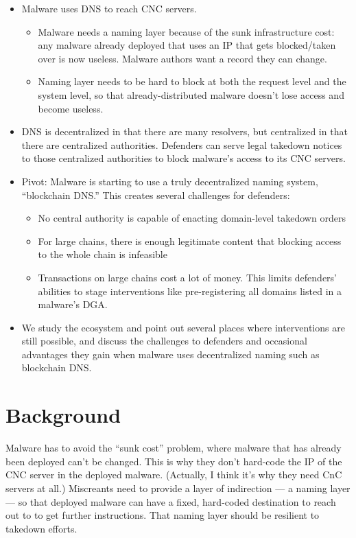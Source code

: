 \documentclass[10pt,sigconf,letterpaper]{acmart}
\begin{document}
\begin{itemize}
	\item Malware uses DNS to reach CNC servers. 
	\begin{itemize}
		\item Malware needs a naming layer because of the 
		sunk infrastructure cost: 
		any malware already deployed that uses an IP that gets blocked/taken 
		over is now useless. Malware authors want a record they can change.
		\item Naming layer needs to be hard to block at both 
		the request level and the system level, so that 
		already-distributed malware doesn't lose access and 
		become useless. 
	\end{itemize}
	\item DNS is decentralized in that there are many resolvers, but 
	centralized in that there are centralized authorities. Defenders can serve 
	legal takedown notices to those centralized authorities to block malware's 
	access to its CNC servers.
	\item Pivot: Malware is starting to use a truly decentralized naming 
	system, ``blockchain DNS.'' This creates several challenges for defenders:
	\begin{itemize}
		\item No central authority is capable of enacting domain-level takedown 
		orders
		\item For large chains, there is enough legitimate content that 
		blocking access to the whole chain is infeasible
		\item Transactions on large chains cost a lot of money. This limits 
		defenders' abilities to stage interventions like pre-registering all 
		domains listed in a malware's DGA.
	\end{itemize}
	\item We study the ecosystem and point out several places where 
	interventions are still possible, and discuss the challenges to defenders 
	and occasional advantages they gain when malware uses decentralized naming 
	such as blockchain DNS.
\end{itemize}

\section{Background}


Malware has to avoid the “sunk cost” problem, where malware that has 
already been deployed can’t be changed. This is why they don’t hard-code 
the IP of the CNC server in the deployed malware. (Actually, I think it’s 
why they need CnC servers at all.) Miscreants need to provide a layer of 
indirection --- a naming layer --- so that deployed malware can have a 
fixed, hard-coded destination to reach out to to get further instructions. 
That naming layer should be resilient to takedown efforts.
\end{document}
